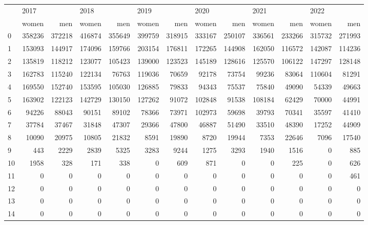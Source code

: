 \begin{tabular}{lrrrrrrrrrrrr}
\toprule
{} & \multicolumn{2}{l}{2017} & \multicolumn{2}{l}{2018} & \multicolumn{2}{l}{2019} & \multicolumn{2}{l}{2020} & \multicolumn{2}{l}{2021} & \multicolumn{2}{l}{2022} \\
{} &   women &     men &   women &     men &   women &     men &   women &     men &   women &     men &   women &     men \\
\midrule
0  &  358236 &  372218 &  416874 &  355649 &  399759 &  318915 &  333167 &  250107 &  336561 &  233266 &  315732 &  271993 \\
1  &  153093 &  144917 &  174096 &  159766 &  203154 &  176811 &  172265 &  144908 &  162050 &  116572 &  142087 &  114236 \\
2  &  135819 &  118212 &  123077 &  105423 &  139000 &  123523 &  145189 &  128616 &  125570 &  106122 &  147297 &  128148 \\
3  &  162783 &  115240 &  122134 &   76763 &  119036 &   70659 &   92178 &   73754 &   99236 &   83064 &  110604 &   81291 \\
4  &  169550 &  152740 &  153595 &  105030 &  126885 &   79833 &   94343 &   75537 &   75840 &   49090 &   54339 &   49663 \\
5  &  163902 &  122123 &  142729 &  130150 &  127262 &   91072 &  102848 &   91538 &  108184 &   62429 &   70000 &   44991 \\
6  &   94226 &   88043 &   90151 &   89102 &   78366 &   73971 &  102973 &   59698 &   39793 &   70341 &   35597 &   41410 \\
7  &   37784 &   37467 &   31848 &   47307 &   29366 &   47800 &   46887 &   51490 &   33510 &   48390 &   17252 &   44909 \\
8  &   10090 &   20975 &   10805 &   21832 &    8591 &   19890 &    8720 &   19944 &    7353 &   22646 &    7096 &   17540 \\
9  &     443 &    2229 &    2839 &    5325 &    3283 &    9244 &    1275 &    3293 &    1940 &    1516 &       0 &     885 \\
10 &    1958 &     328 &     171 &     338 &       0 &     609 &     871 &       0 &       0 &     225 &       0 &     626 \\
11 &       0 &       0 &       0 &       0 &       0 &       0 &       0 &       0 &       0 &       0 &       0 &     461 \\
12 &       0 &       0 &       0 &       0 &       0 &       0 &       0 &       0 &       0 &       0 &       0 &       0 \\
13 &       0 &       0 &       0 &       0 &       0 &       0 &       0 &       0 &       0 &       0 &       0 &       0 \\
14 &       0 &       0 &       0 &       0 &       0 &       0 &       0 &       0 &       0 &       0 &       0 &       0 \\
\bottomrule
\end{tabular}
